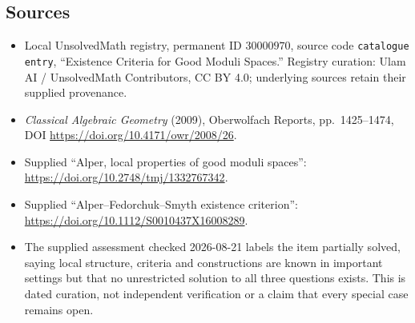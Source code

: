 \documentclass[11pt]{article}
\begin{document}
\subsection{Sources}
\begin{itemize}
\item Local UnsolvedMath registry, permanent ID \(30000970\), source code \texttt{catalogue entry}, ``Existence Criteria for Good Moduli Spaces.'' Registry curation: Ulam AI / UnsolvedMath Contributors, CC BY 4.0; underlying sources retain their supplied provenance.
\item \emph{Classical Algebraic Geometry} (2009), Oberwolfach Reports, pp.\ 1425--1474, DOI \url{https://doi.org/10.4171/owr/2008/26}.
\item Supplied ``Alper, local properties of good moduli spaces'': \url{https://doi.org/10.2748/tmj/1332767342}.
\item Supplied ``Alper--Fedorchuk--Smyth existence criterion'': \url{https://doi.org/10.1112/S0010437X16008289}.
\item The supplied assessment checked 2026-08-21 labels the item partially solved, saying local structure, criteria and constructions are known in important settings but that no unrestricted solution to all three questions exists. This is dated curation, not independent verification or a claim that every special case remains open.
\end{itemize}
\end{document}
